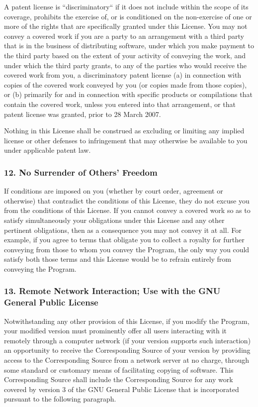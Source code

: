 \documentclass[a4paper, 11pt, twoside]{article}
\begin{document}
A patent license is “discriminatory“ if it does not include within the scope of its coverage, prohibits the exercise of, or is conditioned on the non-exercise of one or more of the rights that are specifically granted under this License. You may not convey a covered work if you are a party to an arrangement with a third party that is in the business of distributing software, under which you make payment to the third party based on the extent of your activity of conveying the work, and under which the third party grants, to any of the parties who would receive the covered work from you, a discriminatory patent license (a) in connection with copies of the covered work conveyed by you (or copies made from those copies), or (b) primarily for and in connection with specific products or compilations that contain the covered work, unless you entered into that arrangement, or that patent license was granted, prior to 28 March 2007.

Nothing in this License shall be construed as excluding or limiting any implied license or other defenses to infringement that may otherwise be available to you under applicable patent law.

\subsubsection{12. No Surrender of Others' Freedom}

If conditions are imposed on you (whether by court order, agreement or otherwise) that contradict the conditions of this License, they do not excuse you from the conditions of this License. If you cannot convey a covered work so as to satisfy simultaneously your obligations under this License and any other pertinent obligations, then as a consequence you may not convey it at all. For example, if you agree to terms that obligate you to collect a royalty for further conveying from those to whom you convey the Program, the only way you could satisfy both those terms and this License would be to refrain entirely from conveying the Program.

\subsubsection{13. Remote Network Interaction; Use with the GNU General Public License}

Notwithstanding any other provision of this License, if you modify the Program, your modified version must prominently offer all users interacting with it remotely through a computer network (if your version supports such interaction) an opportunity to receive the Corresponding Source of your version by providing access to the Corresponding Source from a network server at no charge, through some standard or customary means of facilitating copying of software. This Corresponding Source shall include the Corresponding Source for any work covered by version 3 of the GNU General Public License that is incorporated pursuant to the following paragraph.
\end{document}
